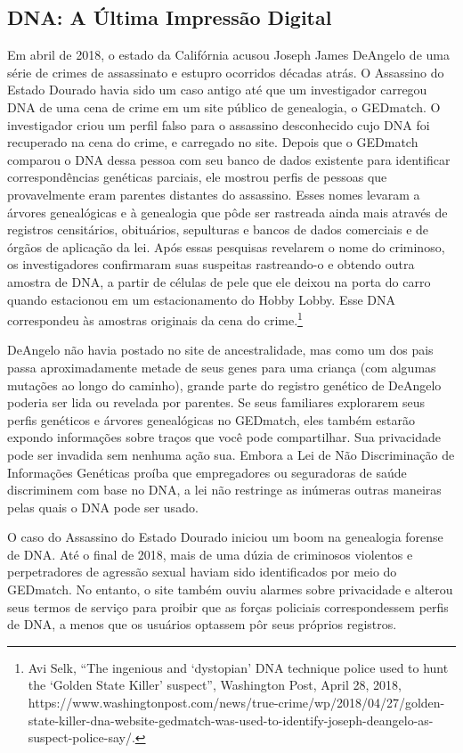 \documentclass{book}
\begin{document}
\subsection{DNA: A Última Impressão Digital}
\label{pegadas:dna}
Em abril de 2018, o estado da Califórnia acusou Joseph James DeAngelo de uma
série de crimes de assassinato e estupro ocorridos décadas atrás. O Assassino
do Estado Dourado havia sido um caso antigo até que um investigador carregou
DNA de uma cena de crime em um site público de genealogia, o GEDmatch. O
investigador criou um perfil falso para o assassino desconhecido cujo DNA
foi recuperado na cena do crime, e carregado no site. Depois que o GEDmatch comparou o DNA dessa pessoa
com seu banco de dados existente para identificar correspondências genéticas
parciais, ele mostrou perfis de pessoas que provavelmente eram parentes
distantes do assassino. Esses nomes levaram a árvores genealógicas e à
genealogia que pôde ser rastreada ainda mais através de registros censitários,
obituários, sepulturas e bancos de dados comerciais e de órgãos de aplicação da
lei. Após essas pesquisas revelarem o nome do criminoso, os investigadores
confirmaram suas suspeitas rastreando-o e obtendo outra amostra de DNA, a
partir de células de pele que ele deixou na porta do carro quando estacionou
em um estacionamento do Hobby Lobby. Esse DNA correspondeu às amostras
originais da cena do crime.\footnote{Avi Selk, ``The ingenious and ‘dystopian’
DNA technique police used to hunt the ‘Golden State Killer’ suspect'',
Washington Post, April 28, 2018,
https://www.washingtonpost.com/news/true-crime/wp/2018/04/27/golden-state-killer-dna-website-gedmatch-was-used-to-identify-joseph-deangelo-as-suspect-police-say/.}

DeAngelo não havia postado no site de ancestralidade, mas como um dos pais passa
aproximadamente metade de seus genes para uma criança (com algumas mutações ao
longo do caminho), grande parte do registro genético de DeAngelo poderia ser
lida ou revelada por parentes. Se seus familiares explorarem seus perfis genéticos
e árvores genealógicas no GEDmatch, eles também estarão expondo informações sobre
traços que você pode compartilhar. Sua privacidade pode ser invadida sem nenhuma
ação sua. Embora a Lei de Não Discriminação de Informações Genéticas proíba que
empregadores ou seguradoras de saúde discriminem com base no DNA, a lei não
restringe as inúmeras outras maneiras pelas quais o DNA pode ser usado.

O caso do Assassino do Estado Dourado iniciou um boom na genealogia forense de DNA.
Até o final de 2018, mais de uma dúzia de criminosos violentos e perpetradores
de agressão sexual haviam sido identificados por meio do GEDmatch. No entanto, o
site também ouviu alarmes sobre privacidade e alterou seus termos de serviço para
proibir que as forças policiais correspondessem perfis de DNA, a menos que os
usuários optassem pôr seus próprios registros.
\end{document}

